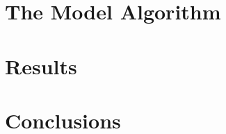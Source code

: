 \documentclass[a4paper]{article}
\begin{document}
\section{The Model Algorithm}\label{sec:algorithm}

\section{Results}\label{sec:results}

\section{Conclusions}\label{sec:conclusions}

\printbibliography
\end{document}
